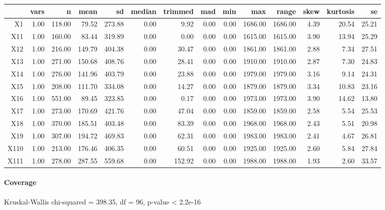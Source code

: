 \begin{tabular}{rrrrrrrrrrrrrr}
  \hline
 & vars & n & mean & sd & median & trimmed & mad & min & max & range & skew & kurtosis & se \\ 
  \hline
X1 & 1.00 & 118.00 & 79.52 & 273.88 & 0.00 & 9.92 & 0.00 & 0.00 & 1686.00 & 1686.00 & 4.39 & 20.54 & 25.21 \\ 
  X11 & 1.00 & 160.00 & 83.44 & 319.89 & 0.00 & 0.00 & 0.00 & 0.00 & 1615.00 & 1615.00 & 3.90 & 13.94 & 25.29 \\ 
  X12 & 1.00 & 216.00 & 149.79 & 404.38 & 0.00 & 30.47 & 0.00 & 0.00 & 1861.00 & 1861.00 & 2.88 & 7.34 & 27.51 \\ 
  X13 & 1.00 & 271.00 & 150.68 & 408.76 & 0.00 & 28.41 & 0.00 & 0.00 & 1910.00 & 1910.00 & 2.87 & 7.30 & 24.83 \\ 
  X14 & 1.00 & 276.00 & 141.96 & 403.79 & 0.00 & 23.88 & 0.00 & 0.00 & 1979.00 & 1979.00 & 3.16 & 9.14 & 24.31 \\ 
  X15 & 1.00 & 208.00 & 111.70 & 334.08 & 0.00 & 14.27 & 0.00 & 0.00 & 1879.00 & 1879.00 & 3.34 & 10.83 & 23.16 \\ 
  X16 & 1.00 & 551.00 & 89.45 & 323.85 & 0.00 & 0.17 & 0.00 & 0.00 & 1973.00 & 1973.00 & 3.90 & 14.62 & 13.80 \\ 
  X17 & 1.00 & 273.00 & 170.69 & 421.76 & 0.00 & 47.04 & 0.00 & 0.00 & 1859.00 & 1859.00 & 2.58 & 5.54 & 25.53 \\ 
  X18 & 1.00 & 370.00 & 185.51 & 403.48 & 0.00 & 83.39 & 0.00 & 0.00 & 1968.00 & 1968.00 & 2.43 & 5.51 & 20.98 \\ 
  X19 & 1.00 & 307.00 & 194.72 & 469.83 & 0.00 & 62.31 & 0.00 & 0.00 & 1983.00 & 1983.00 & 2.41 & 4.67 & 26.81 \\ 
  X110 & 1.00 & 213.00 & 176.46 & 406.35 & 0.00 & 60.51 & 0.00 & 0.00 & 1925.00 & 1925.00 & 2.60 & 5.84 & 27.84 \\ 
  X111 & 1.00 & 278.00 & 287.55 & 559.68 & 0.00 & 152.92 & 0.00 & 0.00 & 1988.00 & 1988.00 & 1.93 & 2.60 & 33.57 \\ 
   \hline
\end{tabular}

\paragraph{Coverage}
Kruskal-Wallis chi-squared = 398.35, df = 96, p-value < 2.2e-16


